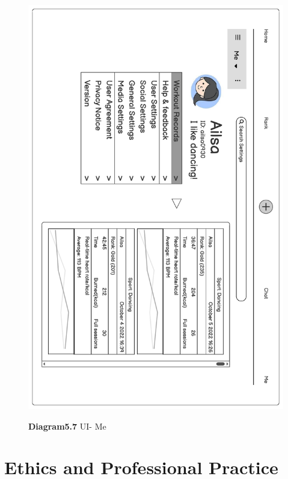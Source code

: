 \documentclass[a4paper]{article}
\begin{document}
	\begin{figure}[H]
		\centering
		\caption*{\textbf{Diagram5.7} UI- Me}
		\includegraphics[width=1\textwidth]{images/UI_Final/UI_Final_7.pdf}
		\label{UI_7}
	\end{figure}
	\newpage


	\section{Ethics and Professional Practice}
\end{document}
